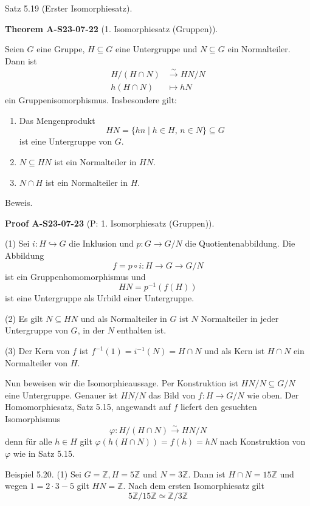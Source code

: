 \documentclass[10pt, letterpaper]{article}
\newcommand{\CustomHeading}[3]{%
  \par\medskip\noindent%
  \textbf{#1 #2} \textnormal{(#3)}.\enskip%
}
\newenvironment{THEO}[2]{\begin{unitbox}\CustomHeading{Theorem}{#1}{#2}}{\end{unitbox}}
\newenvironment{PROOF}[2]{\begin{unitbox}\CustomHeading{Proof}{#1}{#2}}{\end{unitbox}}
\begin{document}
Satz 5.19 (Erster Isomorphiesatz). 


\begin{THEO}{A-S23-07-22}{1. Isomorphiesatz (Gruppen)}
Seien $G$ eine Gruppe, $H \subseteq G$ eine Untergruppe und $N \subseteq G$ ein Normalteiler. Dann ist
$$
\begin{aligned}
H /(H \cap N) & \xrightarrow{\sim} H N / N \\
h(H \cap N) & \mapsto h N
\end{aligned}
$$
ein Gruppenisomorphismus. Insbesondere gilt:
\begin{enumerate}
  \item Das Mengenprodukt
  \[
    HN = \{ h n \mid h \in H,\, n \in N \} \subseteq G
  \]
  ist eine Untergruppe von \( G \).

  \item \( N \subseteq HN \) ist ein Normalteiler in \( HN \).

  \item \( N \cap H \) ist ein Normalteiler in \( H \).
\end{enumerate}
\end{THEO}

Beweis. 

\begin{PROOF}{A-S23-07-23}{P: 1. Isomorphiesatz (Gruppen)}
(1) Sei $i: H \hookrightarrow G$ die Inklusion und $p: G \rightarrow G / N$ die Quotientenabbildung. Die Abbildung
$$
f=p \circ i: H \rightarrow G \rightarrow G / N
$$
ist ein Gruppenhomomorphismus und
$$
H N=p^{-1}(f(H))
$$
ist eine Untergruppe als Urbild einer Untergruppe.

(2) Es gilt $N \subseteq H N$ und als Normalteiler in $G$ ist $N$ Normalteiler in jeder Untergruppe von $G$, in der $N$ enthalten ist.

(3) Der Kern von $f$ ist $f^{-1}(1)=i^{-1}(N)=H \cap N$ und als Kern ist $H \cap N$ ein Normalteiler von $H$.

Nun beweisen wir die Isomorphieaussage. Per Konstruktion ist $H N / N \subseteq G / N$ eine Untergruppe. Genauer ist $H N / N$ das Bild von $f: H \rightarrow G / N$ wie oben. Der Homomorphiesatz, Satz 5.15, angewandt auf $f$ liefert den gesuchten Isomorphismus
$$
\varphi: H /(H \cap N) \xrightarrow{\sim} H N / N
$$
denn für alle $h \in H$ gilt $\varphi(h(H \cap N))=f(h)=h N$ nach Konstruktion von $\varphi$ wie in Satz 5.15.
\end{PROOF}




Beispiel 5.20. (1) Sei $G=\mathbb{Z}, H=5 \mathbb{Z}$ und $N=3 \mathbb{Z}$. Dann ist $H \cap N=15 \mathbb{Z}$ und wegen $1=2 \cdot 3-5$ gilt $H N=\mathbb{Z}$. Nach dem ersten Isomorphiesatz gilt
$$
5 \mathbb{Z} / 15 \mathbb{Z} \simeq \mathbb{Z} / 3 \mathbb{Z}
$$
\end{document}
